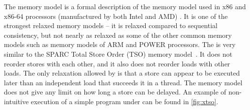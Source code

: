 The \xtso memory model is a formal description of the memory model used in x86
and x86-64 processors (manufactured by both Intel and AMD) .
It is one of the strongest relaxed memory models -- it is relaxed compared to
sequential consistency, but not nearly as relaxed as some of the other common
memory models such as memory models of ARM and POWER processors.
The \xtso is very similar to the SPARC Total Store Order (TSO) memory
model~.
It does not reorder stores with each other, and it also does not reorder loads
with other loads.
The only relaxation allowed by \xtso is that a store can appear to be executed
later than an independent load that succeeds it in a thread.
The memory model does not give any limit on how long a store can be delayed.
An example of non-intuitive execution of a simple program under \xtso can be
found in \autoref{fig:xtso}.

